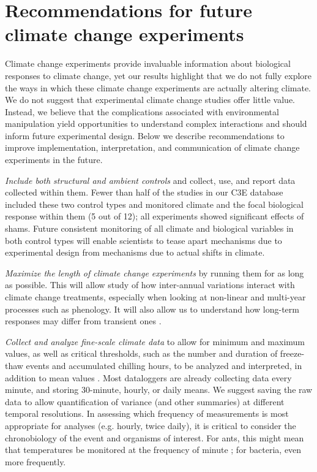 \documentclass{article}
\begin{document}
\section* {Recommendations for future climate change experiments}
 \par Climate change experiments provide invaluable information about biological responses to climate change, yet our results highlight that we do not fully explore the ways in which these climate change experiments are actually altering climate. We do not suggest that experimental climate change studies offer little value. Instead, we believe that the complications associated with environmental manipulation yield opportunities to understand complex interactions and should inform future experimental design. Below we describe recommendations to improve implementation, interpretation, and communication of climate change experiments in the future.
\par\textit{Include both structural and ambient controls} and collect, use, and report data collected within them. Fewer than half of the studies in our C3E database included these two control types and monitored climate and the focal biological response within them (5 out of 12); all experiments showed significant effects of shams. Future consistent monitoring of all climate and biological variables in both control types will enable scientists to tease apart mechanisms due to experimental design from mechanisms due to actual shifts in climate.  
\par\textit{Maximize the length of climate change experiments} by running them for as long as possible. This will allow study of how inter-annual variations interact with climate change treatments, especially when looking at non-linear and multi-year processes such as phenology. It will also allow us to understand how long-term responses may differ from  transient ones \citep{franklin1989,giasson2013}. %
\par\textit{Collect and analyze fine-scale climate data} to allow for minimum and maximum values, as well as critical thresholds, such as the number and duration of freeze-thaw events and accumulated chilling hours, to be analyzed and interpreted, in addition to mean values \citep{mcdaniel2014}. Most dataloggers are already collecting data every minute, and storing 30-minute, hourly, or daily means. We suggest saving the raw data to allow quantification of variance (and other summaries) at different temporal resolutions. In assessing which frequency of measurements is most appropriate for analyses (e.g. hourly, twice daily), it is critical to consider the chronobiology of the event and organisms of interest. For ants, this might mean that temperatures be monitored at the frequency of minute \citep{shavit2017}; for bacteria, even more frequently.
\end{document}
